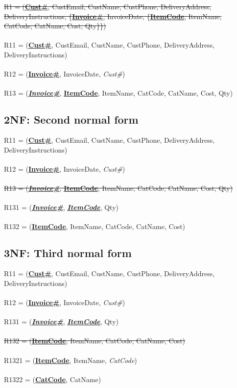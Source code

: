 \sout{R1 = (\textbf{\underline{Cust\#}}, CustEmail, CustName, CustPhone, DeliveryAddress, DeliveryInstructions, \{\textbf{\underline{Invoice\#}}, InvoiceDate, \{\textbf{\underline{ItemCode}}, ItemName, CatCode, CatName, Cost, Qty\}\})}
\\\\
R11 = (\textbf{\underline{Cust\#}}, CustEmail, CustName, CustPhone, DeliveryAddress, DeliveryInstructions)
\\\\
R12 = (\textbf{\underline{Invoice\#}}, InvoiceDate, \emph{Cust\#})
\\\\
R13 = (\textbf{\underline{\emph{Invoice\#}}}, \textbf{\underline{ItemCode}}, ItemName, CatCode, CatName, Cost, Qty)

\subsection{2NF: Second normal form}

R11 = (\textbf{\underline{Cust\#}}, CustEmail, CustName, CustPhone, DeliveryAddress, DeliveryInstructions)
\\\\
R12 = (\textbf{\underline{Invoice\#}}, InvoiceDate, \emph{Cust\#})
\\\\
\sout{R13 = (\textbf{\underline{\emph{Invoice\#}}}, \textbf{\underline{ItemCode}}, ItemName, CatCode, CatName, Cost, Qty)}
\\\\
R131 = (\textbf{\underline{\emph{Invoice\#}}}, \textbf{\underline{\emph{ItemCode}}}, Qty)
\\\\
R132 = (\textbf{\underline{ItemCode}}, ItemName, CatCode, CatName, Cost)

\subsection{3NF: Third normal form}

R11 = (\textbf{\underline{Cust\#}}, CustEmail, CustName, CustPhone, DeliveryAddress, DeliveryInstructions)
\\\\
R12 = (\textbf{\underline{Invoice\#}}, InvoiceDate, \emph{Cust\#})
\\\\
R131 = (\textbf{\underline{\emph{Invoice\#}}}, \textbf{\underline{\emph{ItemCode}}}, Qty)
\\\\
\sout{R132 = (\textbf{\underline{ItemCode}}, ItemName, CatCode, CatName, Cost)}
\\\\
R1321 = (\textbf{\underline{ItemCode}}, ItemName, \emph{CatCode})
\\\\
R1322 = (\textbf{\underline{CatCode}}, CatName)


